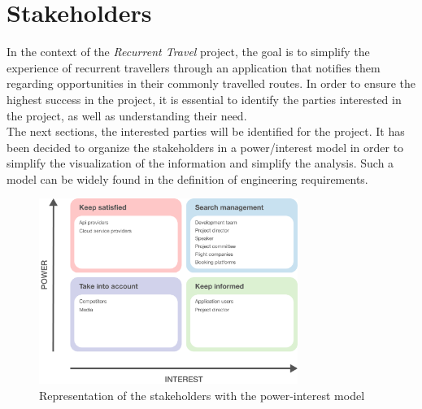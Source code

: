 \documentclass[../memory.tex]{subfiles}
\begin{document}
\section{Stakeholders}
In the context of the \emph{Recurrent Travel} project, the goal is to simplify
the experience of recurrent travellers through an application that notifies them
regarding opportunities in their commonly travelled routes. In order to ensure
the highest success in the project, it is essential to identify the parties
interested in the project, as well as understanding their need.
\\
The next sections, the interested parties will be identified for the project. It
has been decided to organize the stakeholders in a power/interest
model\cite{stakeholders-power-interest} in order to simplify the visualization
of the information and simplify the analysis. Such a model can be widely found in
the definition of engineering requirements.
\begin{figure}[H]
	\centering
	\includegraphics[width=0.75\textwidth]{./assets/stakeholders.png}
	\caption{Representation of the stakeholders with the power-interest model}
\end{figure}
\end{document}

